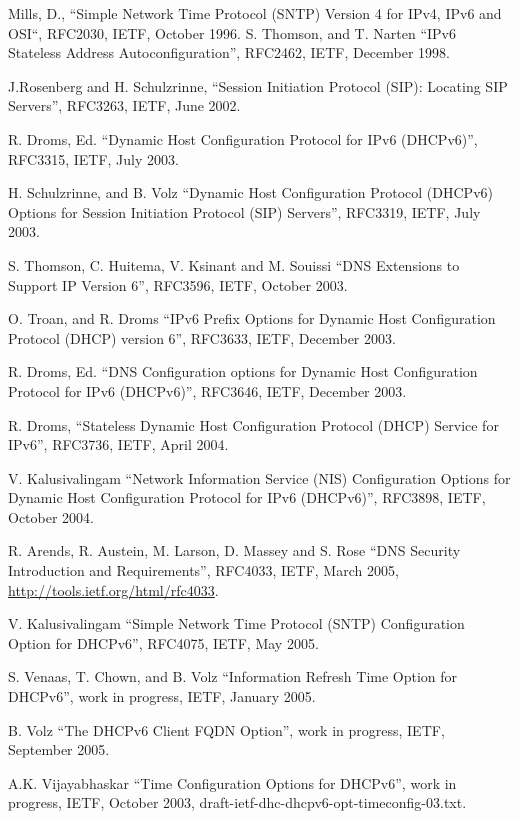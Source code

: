 \newpage
\begin{thebibliography}{1}

 Mills, D., ``Simple Network Time Protocol (SNTP) Version 4 for
        IPv4, IPv6 and OSI``, RFC2030, IETF, October 1996.
 S. Thomson, and T. Narten ``IPv6 Stateless Address
  Autoconfiguration'', RFC2462, IETF, December 1998.

 J.Rosenberg and H. Schulzrinne, ``Session Initiation Protocol
       (SIP): Locating SIP Servers'', RFC3263, IETF, June 2002.

 R. Droms, Ed. ``Dynamic Host Configuration Protocol
  for IPv6 (DHCPv6)'', RFC3315, IETF, July 2003.

 H. Schulzrinne, and B. Volz ``Dynamic Host
  Configuration Protocol (DHCPv6) Options for Session Initiation
  Protocol (SIP) Servers'', RFC3319, IETF, July 2003.

 S. Thomson, C. Huitema, V. Ksinant and M. Souissi
  ``DNS Extensions to Support IP Version 6'', RFC3596, IETF, October
  2003.

 O. Troan, and R. Droms ``IPv6 Prefix Options for
  Dynamic Host Configuration Protocol (DHCP) version 6'', RFC3633,
  IETF, December 2003.

 R. Droms, Ed. ``DNS Configuration options for
  Dynamic Host Configuration Protocol for IPv6 (DHCPv6)'', RFC3646,
  IETF, December 2003.

 R. Droms, ``Stateless Dynamic Host Configuration
  Protocol (DHCP) Service for IPv6'', RFC3736, IETF, April 2004.

 V. Kalusivalingam ``Network Information Service
  (NIS) Configuration Options for Dynamic Host Configuration Protocol
  for IPv6 (DHCPv6)'', RFC3898, IETF, October 2004.

 R. Arends,  R. Austein, M. Larson, D. Massey and S. Rose
``DNS Security Introduction and Requirements'', RFC4033, IETF, March
	2005, \url{http://tools.ietf.org/html/rfc4033}.

 V. Kalusivalingam ``Simple Network Time Protocol
	(SNTP) Configuration Option for DHCPv6'', RFC4075, IETF, May 2005.

 S. Venaas, T. Chown, and B. Volz
  ``Information Refresh Time Option for DHCPv6'', work in
  progress, IETF, January 2005.

 B. Volz
  ``The DHCPv6 Client FQDN Option'', work in
  progress, IETF, September 2005.

 A.K. Vijayabhaskar ``Time Configuration Options
	for DHCPv6'', work in progress, IETF, October 2003,
	draft-ietf-dhc-dhcpv6-opt-timeconfig-03.txt.

\end{thebibliography}
